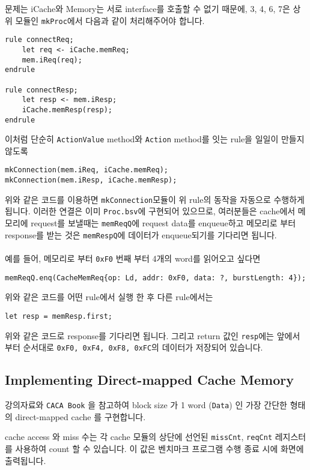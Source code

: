 \documentclass{article}
\begin{document}
\noindent 문제는 iCache와 Memory는 서로 interface를 호출할 수 없기 때문에, 3, 4, 6, 7은 상위 모듈인 \texttt{mkProc}에서 다음과 같이 처리해주어야 합니다.

\begin{Verbatim}[frame=single]
rule connectReq;
	let req <- iCache.memReq;
	mem.iReq(req);	
endrule

rule connectResp;
	let resp <- mem.iResp;
	iCache.memResp(resp);
endrule
\end{Verbatim}
\noindent 이처럼 단순히 \texttt{ActionValue} method와 \texttt{Action} method를 잇는 rule을 일일이 만들지 않도록 

\begin{Verbatim}[frame=single]
mkConnection(mem.iReq, iCache.memReq);
mkConnection(mem.iResp, iCache.memResp);
\end{Verbatim}

\noindent 위와 같은 코드를 이용하면 \texttt{mkConnection}모듈이 위 rule의 동작을 자동으로 수행하게 됩니다.
이러한 연결은 이미 \texttt{Proc.bsv}에 구현되어 있으므로, 여러분들은 cache에서 메모리에 request를 보낼때는
\texttt{memReqQ}에 request data를 enqueue하고 메모리로 부터 response를 받는 것은 \texttt{memRespQ}에 데이터가 enqueue되기를 기다리면 됩니다.
\\\\
예를 들어, 메모리로 부터 \texttt{0xF0} 번째 부터 4개의 word를 읽어오고 싶다면

\begin{Verbatim}
memReqQ.enq(CacheMemReq{op: Ld, addr: 0xF0, data: ?, burstLength: 4});
\end{Verbatim}
위와 같은 코드를 어떤 rule에서 실행 한 후 다른 rule에서는

\begin{Verbatim}
let resp = memResp.first;
\end{Verbatim}
위와 같은 코드로 response를 기다리면 됩니다. 그리고 return 값인 \texttt{resp}에는 앞에서 부터 순서대로 \texttt{0xF0, 0xF4, 0xF8, 0xFC}의 데이터가 저장되어 있습니다.


\subsection{Implementing Direct-mapped Cache Memory}
강의자료와 \texttt{CACA Book} 을 참고하여 block size 가 1 word (\texttt{Data}) 인
가장 간단한 형태의 direct-mapped cache 를 구현합니다.

cache access 와 miss 수는 각 cache 모듈의 상단에 선언된
\texttt{missCnt}, \texttt{reqCnt} 레지스터를 사용하여 count 할 수 있습니다.
이 값은 벤치마크 프로그램 수행 종료 시에 화면에 출력됩니다.
\end{document}
